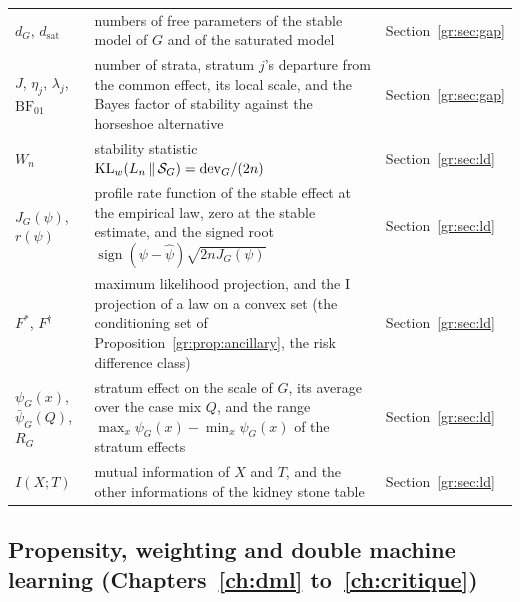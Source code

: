 {\noindent\small\centering
\setlength{\tabcolsep}{4pt}\renewcommand{\arraystretch}{1.1}
\begin{tabular}{>{\raggedright\arraybackslash}p{1.0in}>{\raggedright\arraybackslash}p{2.15in}>{\raggedright\arraybackslash}p{0.95in}}
$d_G$, $d_{\mathrm{sat}}$ & numbers of free parameters of the stable model of $G$ and of the saturated model & Section~\ref{gr:sec:gap} \\
$J$, $\eta_j$, $\lambda_j$, $\mathrm{BF}_{01}$ & number of strata, stratum $j$'s departure from the common effect, its local scale, and the Bayes factor of stability against the horseshoe alternative & Section~\ref{gr:sec:gap} \\
$W_n$ & stability statistic $\mathrm{KL}_w(L_n \,\|\, \mathcal S_G) = \mathrm{dev}_G/(2n)$ & Section~\ref{gr:sec:ld} \\
$J_G(\psi)$, $r(\psi)$ & profile rate function of the stable effect at the empirical law, zero at the stable estimate, and the signed root $\operatorname{sign}(\psi-\hat\psi)\sqrt{2nJ_G(\psi)}$ & Section~\ref{gr:sec:ld} \\
$F^{*}$, $F^{\dagger}$ & maximum likelihood projection, and the I projection of a law on a convex set (the conditioning set of Proposition~\ref{gr:prop:ancillary}, the risk difference class) & Section~\ref{gr:sec:ld} \\
$\psi_G(x)$, $\bar\psi_G(Q)$, $R_G$ & stratum effect on the scale of $G$, its average over the case mix $Q$, and the range $\max_x \psi_G(x) - \min_x \psi_G(x)$ of the stratum effects & Section~\ref{gr:sec:ld} \\
$I(X;T)$ & mutual information of $X$ and $T$, and the other informations of the kidney stone table & Section~\ref{gr:sec:ld} \\
\bottomrule
\end{tabular}\par}

\subsection*{Propensity, weighting and double machine learning (Chapters~\ref{ch:dml} to~\ref{ch:critique})}

